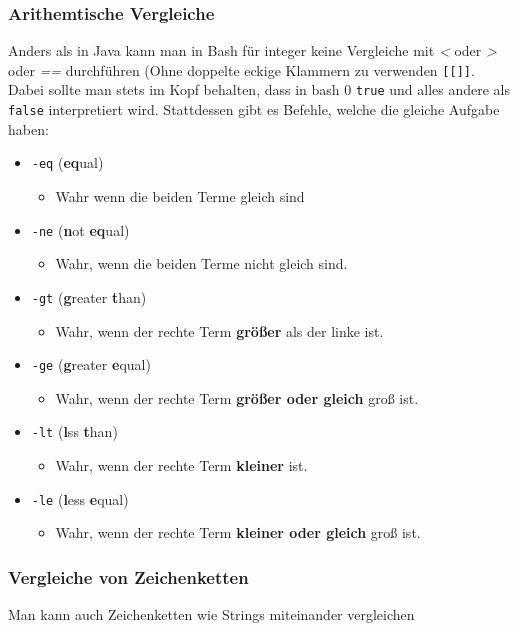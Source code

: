 \documentclass{article}
\begin{document}
	\subsubsection{Arithemtische Vergleiche}
	Anders als in Java kann man in Bash für integer keine Vergleiche mit \textit{<} oder \textit{>} oder \textit{==} durchführen (Ohne doppelte eckige Klammern zu verwenden \verb|[[]]|. Dabei sollte man stets im Kopf behalten, dass in bash 0 \verb|true| und alles andere als \verb|false| interpretiert wird. Stattdessen gibt es Befehle, welche die gleiche Aufgabe haben:
	\begin{itemize}
		\item{\verb|-eq| (\textbf{eq}ual)}
		\begin{itemize}
			\item{Wahr wenn die beiden Terme gleich sind}
		\end{itemize}
		\item{\verb|-ne| (\textbf{n}ot \textbf{eq}ual)}
		\begin{itemize}
			\item{Wahr, wenn die beiden Terme nicht gleich sind.}
		\end{itemize}
		\item{\verb|-gt| (\textbf{g}reater \textbf{t}han)}
		\begin{itemize}
			\item{Wahr, wenn der rechte Term \textbf{größer} als der linke ist.}
		\end{itemize}
		\item{\verb|-ge| (\textbf{g}reater \textbf{e}qual)}
		\begin{itemize}
			\item{Wahr, wenn der rechte Term \textbf{größer oder gleich} groß ist.}
		\end{itemize}
		\item{\verb|-lt| (\textbf{l}ss \textbf{t}han)}
		\begin{itemize}
			\item{Wahr, wenn der rechte Term \textbf{kleiner} ist.}
		\end{itemize}
		\item{\verb|-le| (\textbf{l}ess \textbf{e}qual)}
		\begin{itemize}
			\item{Wahr, wenn der rechte Term \textbf{kleiner oder gleich} groß ist.}
		\end{itemize}
	\end{itemize}
	\subsubsection{Vergleiche von Zeichenketten}
	Man kann auch Zeichenketten wie Strings miteinander vergleichen
\end{document}
